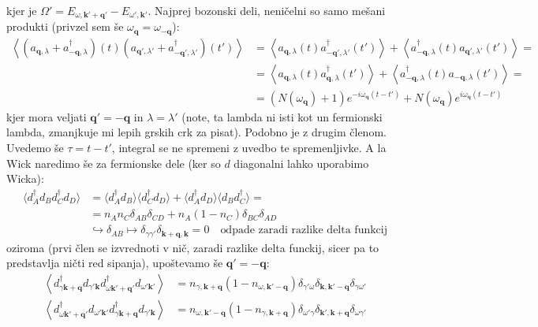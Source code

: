 \documentclass[a4paper,10pt]{article}
\renewcommand{\vec}[1]{\mathbf{#1}}
\begin{document}
kjer je $\Omega' = E_{\omega, \vec k' +\vec{q'}} - E_{\omega', \vec k'} $. Najprej bozonski deli, neničelni so samo mešani produkti (privzel sem še $\omega_\vec{q} = \omega_{-\vec{q}}$):
\begin{align}
  \left\langle \left(a_{\vec q, \lambda} + a_{-\vec q, \lambda}^\dagger\right)(t) \left(a_{\vec{q}', \lambda'} + a_{-\vec{q}', \lambda'}^\dagger\right)(t') \right\rangle &= \left\langle a_{\vec q, \lambda}(t) a_{-\vec{q}', \lambda'}^\dagger(t') \right\rangle + \left\langle a_{-\vec q, \lambda}^\dagger(t) a_{\vec{q}', \lambda'}(t') \right\rangle = \nonumber \\
  &= \left\langle a_{\vec q, \lambda}(t) a_{\vec q, \lambda}^\dagger(t') \right\rangle + \left\langle a_{-\vec q, \lambda}^\dagger(t) a_{-\vec q, \lambda}(t') \right\rangle = \nonumber \\
  &=(N(\omega_{\vec q}) + 1) e^{-i \omega_{\vec q} (t - t')} + N(\omega_{\vec q}) e^{i \omega_{\vec q} (t - t')} 
\end{align}
kjer mora veljati $\vec{q}' = -\vec{q}$ in $\lambda=\lambda'$ (note, ta lambda ni isti kot un fermionski lambda, zmanjkuje mi lepih grskih crk za pisat). Podobno je z drugim členom. Uvedemo še $\tau = t-t'$, integral se ne spremeni z uvedbo te spremenljivke. A la Wick naredimo še za fermionske dele (ker so $d$ diagonalni lahko uporabimo Wicka): 
\begin{align}
  \langle d_A^\dagger d_B d_C^\dagger d_D \rangle &= \langle d_A^\dagger d_B \rangle \langle d_C^\dagger d_D \rangle + \langle d_A^\dagger d_D \rangle \langle d_B d_C^\dagger \rangle = \\
  &= {n_A n_C \delta_{AB} \delta_{CD}} + n_A (1 - n_C) \delta_{BC} \delta_{AD} \\
  &\hookrightarrow \delta_{AB} \mapsto \delta_{\gamma \gamma'} \delta_{\vec{k}+\vec{q}, \vec{k}} = 0 \quad \text{odpade zaradi razlike delta funkcij}
\end{align}
oziroma (prvi člen se izvrednoti v nič, zaradi razlike delta funckij, sicer pa to predstavlja ničti red sipanja), upoštevamo še $\vec{q}' = -\vec{q}$:
\begin{align}
  \left\langle d_{\gamma \vec{k}+\vec{q}}^\dagger d_{\gamma' \vec{k}} d_{\omega \vec{k}'+\vec{q}'}^\dagger d_{\omega' \vec{k}'} \right\rangle &= n_{\gamma, \vec{k}+\vec{q}} \left(1 - n_{\omega, \vec{k}'-\vec{q}}\right) \delta_{\gamma' \omega} \delta_{\vec{k}, \vec{k}'-\vec{q}} \delta_{\gamma \omega'}  \\ \left\langle d_{\omega \vec{k}'+\vec{q}'}^\dagger d_{\omega' \vec{k}'} d_{\gamma \vec{k}+\vec{q}}^\dagger d_{\gamma' \vec{k}} \right\rangle &= n_{\omega, \vec{k}'-\vec{q}} \left(1 - n_{\gamma, \vec{k}+\vec{q}}\right) \delta_{\omega' \gamma} \delta_{\vec{k}', \vec{k}+\vec{q}} \delta_{\omega \gamma'}
\end{align}
\end{document}
